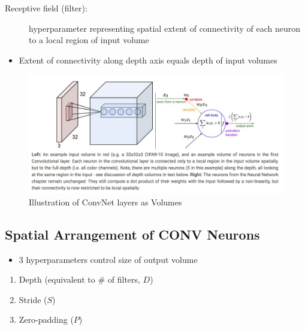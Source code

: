 \documentclass[a4paper,12pt]{article}
\begin{document}
\begin{description}
  \item[Receptive field (filter):] hyperparameter representing spatial extent of connectivity of each neuron to a local region of input volume
\end{description}
\begin{itemize}
  \item Extent of connectivity along depth axis equals depth of input volumes
\end{itemize}

\begin{figure}[th]
  \centering
  \includegraphics[width=165mm, scale=1]{images/ConvNet-Filter-Weights.png}
  \caption{Illustration of ConvNet layers as Volumes}
  \label{Filter-Weights}
\end{figure}

\subsection{Spatial Arrangement of CONV Neurons}
\begin{itemize}
  \item 3 hyperparameters control size of output volume
\end{itemize}
\begin{enumerate}
  \item Depth (equivalent to \# of filters, $D$)
  \item Stride ($S$)
  \item Zero-padding ($P$)
\end{enumerate}
\end{document}
